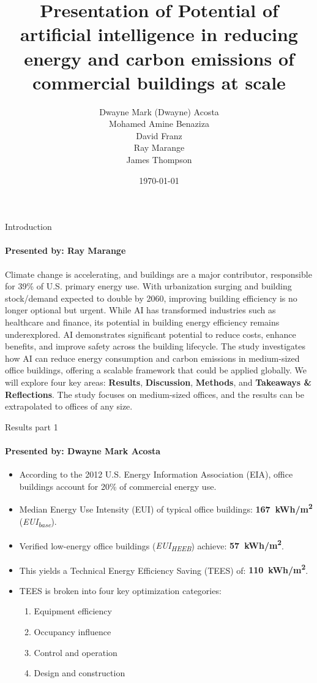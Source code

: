 \documentclass{beamer}
\title{Presentation of Potential of artificial intelligence in reducing energy and carbon emissions of commercial buildings at scale}
\author{Dwayne Mark (Dwayne) Acosta \\ Mohamed Amine Benaziza \\ David Franz \\ Ray Marange \\ James Thompson}
\date{\today}
\begin{document}
\frame{\titlepage}

\begin{frame}{Introduction}
\framesubtitle{Presented by: Ray Marange}
Climate change is accelerating, and buildings are a major contributor, responsible for 39\% of U.S. primary energy use. With urbanization surging and building stock/demand expected to double by 2060, improving building efficiency is no longer optional but urgent.
While AI has transformed industries such as healthcare and finance, its potential in building energy efficiency remains underexplored. AI demonstrates significant potential to reduce costs, enhance benefits, and improve safety across the building lifecycle. The study investigates how AI can reduce energy consumption and carbon emissions in medium-sized office buildings, offering a scalable framework that could be applied globally.
We will explore four key areas: \textbf{Results}, \textbf{Discussion}, \textbf{Methods}, and \textbf{Takeaways \& Reflections}. The study focuses on medium-sized offices, and the results can be extrapolated to offices of any size.
\end{frame}

\begin{frame}{Results part 1}
\framesubtitle{Presented by: Dwayne Mark Acosta}
\begin{itemize}
    \item According to the 2012 U.S. Energy Information Association (EIA), office buildings account for 20\% of commercial energy use.
    \item Median Energy Use Intensity (EUI) of typical office buildings: \textbf{167~kWh/m\textsuperscript{2}} (\textit{EUI\textsubscript{base}}).
    \item Verified low-energy office buildings (\textit{EUI\textsubscript{HEEB}}) achieve: \textbf{57~kWh/m\textsuperscript{2}}.
    \item This yields a Technical Energy Efficiency Saving (TEES) of: \textbf{110~kWh/m\textsuperscript{2}}.
    \item TEES is broken into four key optimization categories:
    \begin{enumerate}
        \item Equipment efficiency
        \item Occupancy influence
        \item Control and operation
        \item Design and construction
    \end{enumerate}
\end{itemize}
\end{frame}
\end{document}
